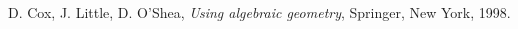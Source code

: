 \documentclass{amsart}
\theoremstyle{definition}
\theoremstyle{remark}
\numberwithin{equation}{section}
\newcommand{\<}{\langle}
\renewcommand{\>}{\rangle}
\begin{document}
\begin{thebibliography}{99}




 D. Cox, J. Little, D. O'Shea, \emph{Using algebraic geometry},
Springer, New York, 1998.


%
%




\end{thebibliography}
\end{document}
